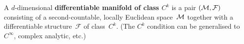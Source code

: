A $d$-dimensional \textbf{differentiable manifold of class $C^k$}
is a pair $(\mathcal{M},\mathcal{F})$ consisting of a second-countable,
locally Euclidean space~$\mathcal{M}$ together with a differentiable
structure~$\mathcal{F}$ of class~$C^k$.
(The $C^k$ condition can be generalised to $C^\infty$, complex
analytic, etc.)
